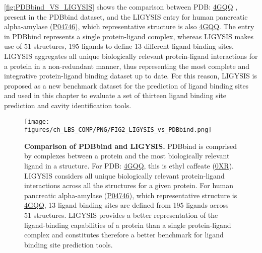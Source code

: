 \autoref{fig:PDBbind_VS_LIGYSIS} shows the comparison between PDB: \href{https://www.ebi.ac.uk/pdbe/entry/pdb/4GQQ}{4GQQ} \cite{WILLIAMS_2012_AMYLASE}, present in the PDBbind dataset, and the LIGYSIS entry for human pancreatic alpha-amylase (\href{https://www.uniprot.org/uniprotkb/P04746/entry}{P04746}), which representative structure is also \href{https://www.ebi.ac.uk/pdbe/entry/pdb/4GQQ}{4GQQ}. The entry in PDBbind represents a single protein-ligand complex, whereas LIGYSIS makes use of 51 structures, 195 ligands to define 13 different ligand binding sites. LIGYSIS aggregates all unique biologically relevant protein-ligand interactions for a protein in a non-redundant manner, thus representing the most complete and integrative protein-ligand binding dataset up to date. For this reason, LIGYSIS is proposed as a new benchmark dataset for the prediction of ligand binding sites and used in this chapter to evaluate a set of thirteen ligand binding site prediction and cavity identification tools.

\begin{figure}[htb!]
    \centering
    \texttt{[image: figures/ch\_LBS\_COMP/PNG/FIG2\_LIGYSIS\_vs\_PDBbind.png]}
    \caption[Comparison of PDBbind and LIGYSIS]{\textbf{Comparison of PDBbind and LIGYSIS.} PDBbind is comprised by complexes between a protein and the most biologically relevant ligand in a structure. For PDB: \href{https://www.ebi.ac.uk/pdbe/entry/pdb/4GQQ}{4GQQ}, this is ethyl caffeate (\href{https://www.ebi.ac.uk/pdbe-srv/pdbechem/chemicalCompound/show/0XR}{0XR}). LIGYSIS considers all unique biologically relevant protein-ligand interactions across all the structures for a given protein. For human pancreatic alpha-amylase (\href{https://www.uniprot.org/uniprotkb/P04746/entry}{P04746}), which representative structure is \href{https://www.ebi.ac.uk/pdbe/entry/pdb/4GQQ}{4GQQ}, 13 ligand binding sites are defined from 195 ligands across 51 structures. LIGYSIS provides a better representation of the ligand-binding capabilities of a protein than a single protein-ligand complex and constitutes therefore a better benchmark for ligand binding site prediction tools.}
    \label{fig:PDBbind_VS_LIGYSIS}
\end{figure}


